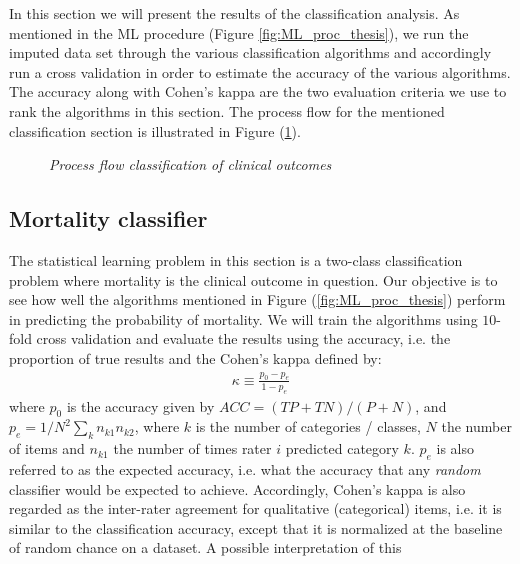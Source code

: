 \documentclass[../thesis.tex]{subfiles}
\begin{document}
\noindent In this section we will present the results of the classification analysis. As mentioned in the ML procedure (Figure \ref{fig:ML_proc_thesis}), we run the imputed data set through the various classification algorithms and accordingly run a cross validation in order to estimate the accuracy of the various algorithms. The accuracy along with Cohen’s kappa are the two evaluation criteria we use to rank the algorithms in this section. The process flow for the mentioned classification section is illustrated in Figure (\ref{fig:process_flow_classification}). 

\begin{figure}[!t]
    \centering
    
    \caption[Process flow classification of clinical outcomes]{\textit{Process flow classification of clinical outcomes}}
    \label{fig:process_flow_classification}
\end{figure}

\subsection{Mortality classifier}

\noindent The statistical learning problem in this section is a two-class classification problem where mortality is the clinical outcome in question. Our objective is to see how well the algorithms mentioned in Figure (\ref{fig:ML_proc_thesis}) perform in predicting the probability of mortality. We will train the algorithms using $10$-fold cross validation and evaluate the results using the accuracy, i.e. the proportion of true results and the Cohen's kappa defined by:
\newpage
\begin{align}
    \kappa \equiv \frac{p_0 - p_e}{1 - p_e}
\end{align}
where $p_0$ is the accuracy given by ${\mathit  {ACC}}=({\mathit  {TP}}+{\mathit  {TN}})/(P+N)$, and $p_e = 1 / N^2 \sum_{k} n_{k1}n_{k2}$, where $k$ is the number of categories / classes, $N$ the number of items and $n_{k1}$ the number of times rater $i$ predicted category $k$. $p_e$ is also referred to as the expected accuracy, i.e. what the accuracy that any \textit{random} classifier would be expected to achieve. Accordingly, Cohen's kappa is also regarded as the inter-rater agreement for qualitative (categorical) items, i.e. it is similar to the classification accuracy, except that it is normalized at the baseline of random chance on a dataset. A possible interpretation of this    
\end{document}
